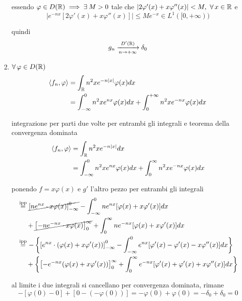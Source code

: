 \begin{enumerate}
essendo $\varphi \in D(\RR) \implies \exists M > 0$ tale che $| 2\varphi '(x) + x\varphi ''(x)| < M, \ \forall x\in \RR $ e
\begin{equation*}
\left| e^{- nx}[ 2\varphi '(x) + x\varphi ''(x)]\right| \leq Me^{- x} \in L^{1}([ 0, + \infty))
\end{equation*}

quindi
\begin{equation*}
g_{n}\xrightarrow[n\rightarrow + \infty ]{D'(\mathbb{R})} \delta_{0}
\end{equation*}
\item $\forall \varphi \in D(\RR)$
\begin{equation*}
\begin{aligned}
\langle f_{n}, \varphi \rangle  & = \int_{\mathbb{R}} n^{2} xe^{- n| x|} \varphi (x) dx\\
 & = \int^{0}_{- \infty} n^{2} xe^{nx} \varphi (x) dx + \int^{+ \infty}_{0} n^{2} xe^{- nx} \varphi (x) dx
\end{aligned}
\end{equation*}

integrazione per parti due volte per entrambi gli integrali e teorema della convergenza dominata
\begin{align*}
\langle f_{n}, \varphi \rangle  & = \int_{\mathbb{R}} n^{2} xe^{- n| x|} dx\\
 & = \int^{0}_{- \infty} n^{2} xe^{nx} \varphi (x) dx + \int^{\infty}_{0} n^{2} xe^{- nx} \varphi (x) dx
\end{align*}

ponendo $f = x\varphi (x)$ e $g'$ l'altro pezzo per entrambi gli integrali
\begin{align*}
 & \overset{\text{ipp}}{=}\cancel{\left[ ne^{nx} \cdot x\varphi (x)\right]^{0}_{- \infty}} - \int^{0}_{- \infty} ne^{nx}[ \varphi (x) + x\varphi '(x)] dx\\
 & \ \ \ \ + \cancel{\left[ - ne^{- nx} \cdot x\varphi (x)\right]^{\infty}_{0}} + \int^{\infty}_{0} ne^{- nx}[ \varphi (x) + x\varphi '(x)] dx\\
 & \overset{\text{ipp}}{=} - \left\{\left[ e^{nx} \cdot (\varphi (x) + x\varphi '(x))\right]^{0}_{- \infty} - \int^{0}_{- \infty} e^{nx}[ \varphi '(x) - \varphi '(x) - x\varphi ''(x)] dx\right\}\\
 & \ \ \ \ + \left\{\left[ - e^{- nx}(\varphi (x) + x\varphi '(x))\right]^{\infty}_{0} + \int^{\infty}_{0} e^{- nx}[ \varphi '(x) + \varphi '(x) + x\varphi ''(x)] dx\right\}
\end{align*}

al limite i due integrali si cancellano per convergenza dominata, rimane
\begin{equation*}
- [ \varphi (0) - 0] + [ 0 - (- \varphi (0))] = - \varphi (0) + \varphi (0) = - \delta_{0} + \delta_{0} = 0
\end{equation*}
\end{enumerate}
